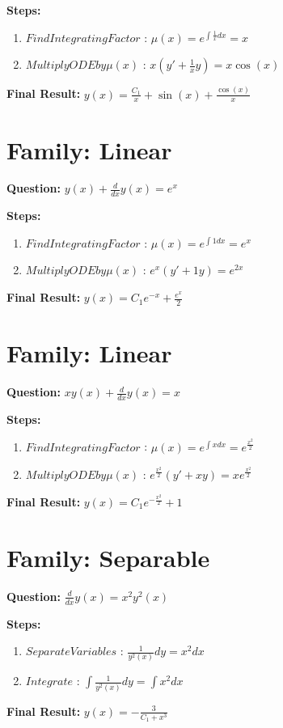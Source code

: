 \documentclass{article}
\begin{document}
\textbf{Steps:}
\begin{enumerate}
\item $Find Integrating Factor$ :  $\mu(x) = e^{\int \frac{1}{x} dx} = x$
\item $Multiply ODE by \mu(x)$ :  $x(y' + \frac{1}{x}y) = x \cos{\left(x \right)}$
\end{enumerate}
\textbf{Final Result:} $y{\left(x \right)} = \frac{C_{1}}{x} + \sin{\left(x \right)} + \frac{\cos{\left(x \right)}}{x}$

\section*{Family: Linear}
\textbf{Question:} $y{\left(x \right)} + \frac{d}{d x} y{\left(x \right)} = e^{x}$

\textbf{Steps:}
\begin{enumerate}
\item $Find Integrating Factor$ :  $\mu(x) = e^{\int 1 dx} = e^{x}$
\item $Multiply ODE by \mu(x)$ :  $e^{x}(y' + 1y) = e^{2 x}$
\end{enumerate}
\textbf{Final Result:} $y{\left(x \right)} = C_{1} e^{- x} + \frac{e^{x}}{2}$

\section*{Family: Linear}
\textbf{Question:} $x y{\left(x \right)} + \frac{d}{d x} y{\left(x \right)} = x$

\textbf{Steps:}
\begin{enumerate}
\item $Find Integrating Factor$ :  $\mu(x) = e^{\int x dx} = e^{\frac{x^{2}}{2}}$
\item $Multiply ODE by \mu(x)$ :  $e^{\frac{x^{2}}{2}}(y' + xy) = x e^{\frac{x^{2}}{2}}$
\end{enumerate}
\textbf{Final Result:} $y{\left(x \right)} = C_{1} e^{- \frac{x^{2}}{2}} + 1$

\section*{Family: Separable}
\textbf{Question:} $\frac{d}{d x} y{\left(x \right)} = x^{2} y^{2}{\left(x \right)}$

\textbf{Steps:}
\begin{enumerate}
\item $Separate Variables$ :  $\frac{1}{y^{2}{\left(x \right)}} dy = x^{2} dx$
\item $Integrate$ :  $\int \frac{1}{y^{2}{\left(x \right)}} dy = \int x^{2} dx$
\end{enumerate}
\textbf{Final Result:} $y{\left(x \right)} = - \frac{3}{C_{1} + x^{3}}$
\end{document}
